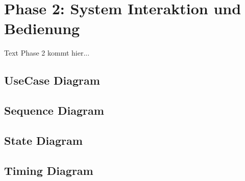 \chapter{Phase 2: System Interaktion und Bedienung}

Text Phase 2 kommt hier...

\section{UseCase Diagram}

\section{Sequence Diagram}

\section{State Diagram}

\section{Timing Diagram}

